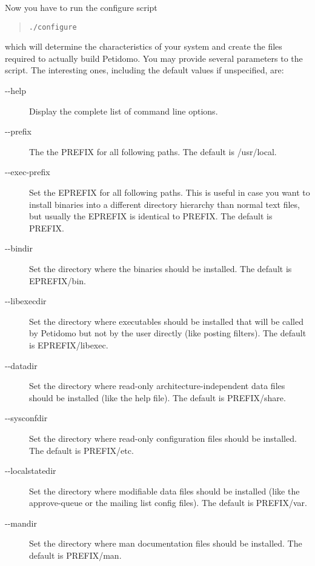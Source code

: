 \documentclass[a4paper,10pt]{scrreprt}
\begin{document}
Now you have to run the configure script
\begin{quote}
\begin{verbatim}
./configure
\end{verbatim}
\end{quote}
which will determine the characteristics of your system and create the
files required to actually build Petidomo. You may provide several
parameters to the script. The interesting ones, including the default
values if unspecified, are:
\begin{description}

\item[{-}{-}help] Display the complete list of command line options.

\item[{-}{-}prefix] The the {\sf PREFIX} for all following paths. The
default is {\sf /usr/local}.

\item[{-}{-}exec-prefix] Set the {\sf EPREFIX} for all following
paths. This is useful in case you want to install binaries into a
different directory hierarchy than normal text files, but usually the
{\sf EPREFIX} is identical to {\sf PREFIX}. The default is {\sf
PREFIX}.

\item[{-}{-}bindir] Set the directory where the binaries should be
installed. The default is {\sf EPREFIX/bin}.

\item[{-}{-}libexecdir] Set the directory where executables should be
installed that will be called by Petidomo but not by the user directly
(like posting filters). The default is {\sf EPREFIX/libexec}.

\item[{-}{-}datadir] Set the directory where read-only
architecture-independent data files should be installed (like the help
file). The default is {\sf PREFIX/share}.

\item[{-}{-}sysconfdir] Set the directory where read-only
configuration files should be installed. The default is {\sf
PREFIX/etc}.

\item[{-}{-}localstatedir] Set the directory where modifiable
data files should be installed (like the approve-queue or the mailing
list config files). The default is {\sf PREFIX/var}.

\item[{-}{-}mandir] Set the directory where man documentation files
should be installed. The default is {\sf PREFIX/man}.

\end{description}
\end{document}
